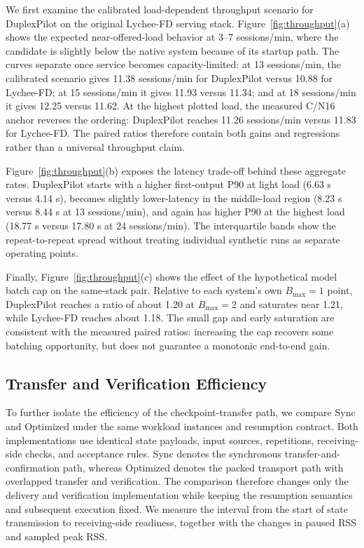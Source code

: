 \documentclass{article}
\begin{document}
We first examine the calibrated load-dependent throughput scenario for DuplexPilot on the original Lychee-FD serving stack. Figure~\ref{fig:throughput}(a) shows the expected near-offered-load behavior at 3--7 sessions/min, where the candidate is slightly below the native system because of its startup path. The curves separate once service becomes capacity-limited: at 13 sessions/min, the calibrated scenario gives 11.38 sessions/min for DuplexPilot versus 10.88 for Lychee-FD; at 15 sessions/min it gives 11.93 versus 11.34; and at 18 sessions/min it gives 12.25 versus 11.62. At the highest plotted load, the measured C/N16 anchor reverses the ordering: DuplexPilot reaches 11.26 sessions/min versus 11.83 for Lychee-FD. The paired ratios therefore contain both gains and regressions rather than a universal throughput claim.

Figure~\ref{fig:throughput}(b) exposes the latency trade-off behind these aggregate rates. DuplexPilot starts with a higher first-output P90 at light load (6.63 s versus 4.14 s), becomes slightly lower-latency in the middle-load region (8.23 s versus 8.44 s at 13 sessions/min), and again has higher P90 at the highest load (18.77 s versus 17.80 s at 24 sessions/min). The interquartile bands show the repeat-to-repeat spread without treating individual synthetic runs as separate operating points.

Finally, Figure~\ref{fig:throughput}(c) shows the effect of the hypothetical model batch cap on the same-stack pair. Relative to each system's own $B_{\max}=1$ point, DuplexPilot reaches a ratio of about 1.20 at $B_{\max}=2$ and saturates near 1.21, while Lychee-FD reaches about 1.18. The small gap and early saturation are consistent with the measured paired ratios: increasing the cap recovers some batching opportunity, but does not guarantee a monotonic end-to-end gain.

\subsection{Transfer and Verification Efficiency}
\label{sec:transfer}

To further isolate the efficiency of the checkpoint-transfer path, we compare
Sync and Optimized under the same workload instances and resumption
contract. Both implementations use identical state payloads, input
sources, repetitions, receiving-side checks, and acceptance rules. Sync
denotes the synchronous transfer-and-confirmation path, whereas
Optimized denotes the packed transport path with overlapped transfer
and verification. The comparison therefore changes only the delivery
and verification implementation while keeping the resumption semantics
and subsequent execution fixed. We measure the interval from the start
of state transmission to receiving-side readiness, together with the
changes in paused RSS and sampled peak RSS.
\end{document}

